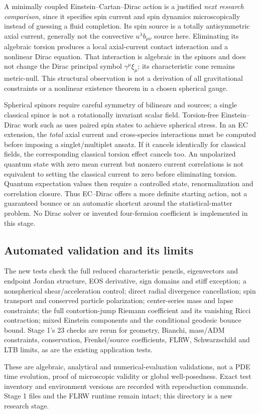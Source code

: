 A minimally coupled Einstein--Cartan--Dirac action is a justified \emph{next research comparison}, since it specifies spin current and spin dynamics microscopically instead of guessing a fluid completion. Its spin source is a totally antisymmetric axial current, generally not the convective $u^\lambda b_{\mu\nu}$ source here. Eliminating its algebraic torsion produces a local axial-current contact interaction and a nonlinear Dirac equation. That interaction is algebraic in the spinors and does not change the Dirac principal symbol $\gamma^\mu\xi_\mu$; its characteristic cone remains metric-null. This structural observation is not a derivation of all gravitational constraints or a nonlinear existence theorem in a chosen spherical gauge.

Spherical spinors require careful symmetry of bilinears and sources; a single classical spinor is not a rotationally invariant scalar field. Torsion-free Einstein--Dirac work such as \cite{FSY} uses paired spin states to achieve spherical stress. In an EC extension, the \emph{total} axial current and cross-species interactions must be computed before imposing a singlet/multiplet ansatz. If it cancels identically for classical fields, the corresponding classical torsion effect cancels too. An unpolarized quantum state with zero mean current but nonzero current correlations is not equivalent to setting the classical current to zero before eliminating torsion. Quantum expectation values then require a controlled state, renormalization and correlation closure. Thus EC--Dirac offers a more definite starting action, not a guaranteed bounce or an automatic shortcut around the statistical-matter problem. No Dirac solver or invented four-fermion coefficient is implemented in this stage.

\subsection{Automated validation and its limits}
The new tests check the full reduced characteristic pencils, eigenvectors and endpoint Jordan structure, EOS derivative, sign domains and stiff exception; a nonspherical shear/acceleration control; direct radial divergence cancellation; spin transport and conserved particle polarization; center-series mass and lapse constraints; the full contortion-jump Riemann coefficient and its vanishing Ricci contraction; mixed Einstein components and the conditional geodesic bounce bound. Stage 1's 23 checks are rerun for geometry, Bianchi, mass/ADM constraints, conservation, Frenkel/source coefficients, FLRW, Schwarzschild and LTB limits, as are the existing application tests.

These are algebraic, analytical and numerical-evaluation validations, not a PDE time evolution, proof of microscopic validity or global well-posedness. Exact test inventory and environment versions are recorded with reproduction commands. Stage 1 files and the FLRW runtime remain intact; this directory is a new research stage.
